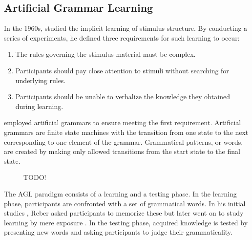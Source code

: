 \subsection{Artificial Grammar Learning}
In the 1960s, \citeauthor{reber1967implicit} studied the implicit learning of stimulus structure. By conducting a series of experiments, he defined three requirements \citep[p.~190]{reber1978analogic} for such learning to occur:
\begin{enumerate}
\item The rules governing the stimulus material must be complex.
\item Participants should pay close attention to stimuli without searching for underlying rules.
\item Participants should be unable to verbalize the knowledge they obtained during learning. 
\end{enumerate}
\citeauthor{reber1967implicit} employed artificial grammars to ensure meeting the first requirement. Artificial grammars are finite state machines with the transition from one state to the next corresponding to one element of the grammar. Grammatical patterns, or words, are created by making only allowed transitions from the start state to the final state. 
\begin{figure}
\centering
\hspace*{-1.55cm}
\caption{TODO!}
\end{figure}
The AGL paradigm consists of a learning and a testing phase. In the learning phase, participants are confronted with a set of grammatical words. In his initial studies \citep{reber1967implicit}, Reber asked participants to memorize these but later went on to study learning by mere exposure \citep{reber1978analogic}. In the testing phase, acquired knowledge is tested by presenting new words and asking participants to judge their grammaticality. 
